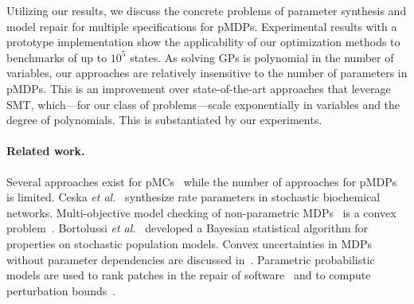 Utilizing our results, we discuss the concrete problems of parameter synthesis and model repair for multiple specifications for pMDPs.
Experimental results with a prototype implementation show the applicability of our optimization methods to benchmarks of up to $10^5$ states.
%
As solving GPs is polynomial in the number of variables, our approaches are relatively insensitive to the number of parameters in pMDPs. This is an improvement over state-of-the-art approaches that leverage SMT, which---for our class of problems---scale exponentially in variables and the degree of polynomials. 
This is substantiated by our experiments.


\paragraph{Related work.}
Several approaches exist for pMCs~\cite{PARAM10,dehnert-et-al-cav-2015,param_sttt,jansen-et-al-qest-2014} while the number of approaches for pMDPs~\cite{param_sttt,quatmann-et-al-atva-2016} is limited.
Ceska \emph{et al.}~\cite{DBLP:conf/cmsb/CeskaDKP14} synthesize rate parameters in stochastic biochemical networks. 
Multi-objective model checking of non-parametric MDPs~\cite{DBLP:journals/lmcs/EtessamiKVY08} is a convex problem~\cite{DBLP:conf/tacas/ForejtKNPQ11}. 
Bortolussi \emph{et al.}~\cite{DBLP:journals/iandc/BortolussiMS16} developed a Bayesian statistical algorithm for properties on stochastic population models.
Convex uncertainties in MDPs without parameter dependencies are discussed in~\cite{seshia_et_al_cav_13}.
Parametric probabilistic models are used to rank patches in the repair of software~\cite{DBLP:conf/popl/LongR16} and to compute perturbation bounds~\cite{rosenblum-et-al-atva-2014,su-et-al-icse-2016-qosevaluation}. 






%

